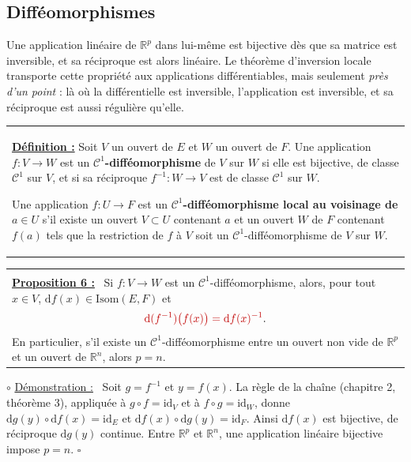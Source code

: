 \documentclass[a4paper,twoside]{report}
\makeatletter
\newcommand{\mot}[1]{\textcolor{rougecours}{\textbf{#1}}}
\newcommand{\rmath}[1]{\textcolor{rougecours}{#1}}
\newenvironment{cadre}%
 {\par\vspace{2mm}\noindent\begin{tabular}{|@{\hspace{4mm}}p{0.93\textwidth}@{\hspace{4mm}}|}
  \hline \\[-2mm]}%
 {\\[2mm] \hline \end{tabular}\par\vspace{3mm}}
\newcommand{\propo}[1]{\textbf{\underline{Proposition #1 :}}~}
\newenvironment{demo}%
 {\par\needspace{4\baselineskip}\vspace{1mm}\noindent$\circ$ \underline{Démonstration :}~\setlength{\parskip}{3pt plus 1pt}}%
 {\hfill$\square$\par\vspace{2mm}}
\newcommand{\R}{\mathbb{R}}
\newcommand{\id}{\mathrm{id}}                     %
\newcommand{\dd}{\mathrm{d}}                      %
\newcommand{\Cc}{\mathcal{C}}                     %
\newcommand{\Isom}{\mathrm{Isom}}                 %
\makeatother
\begin{document}
\subsection{Difféomorphismes}

Une application linéaire de $\R^{p}$ dans lui-même est bijective dès que sa matrice est inversible, et sa réciproque est alors linéaire. Le théorème d'inversion locale transporte cette propriété aux applications différentiables, mais seulement \emph{près d'un point} : là où la différentielle est inversible, l'application est inversible, et sa réciproque est aussi régulière qu'elle.

\begin{center}
\begin{tabularx}{15cm}{||X}
\noindent \textbf{\underline{Définition :}} Soit $V$ un ouvert de $E$ et $W$ un ouvert de $F$. Une application $f : V \to W$ est un \mot{$\Cc^{1}$-difféomorphisme} de $V$ sur $W$ si elle est bijective, de classe $\Cc^{1}$ sur $V$, et si sa réciproque $f^{-1} : W \to V$ est de classe $\Cc^{1}$ sur $W$.

\noindent Une application $f : U \to F$ est un \mot{$\Cc^{1}$-difféomorphisme local au voisinage de $a \in U$} s'il existe un ouvert $V \subset U$ contenant $a$ et un ouvert $W$ de $F$ contenant $f(a)$ tels que la restriction de $f$ à $V$ soit un $\Cc^{1}$-difféomorphisme de $V$ sur $W$.
\end{tabularx}
\end{center}

\begin{cadre}
\propo{6} Si $f : V \to W$ est un $\Cc^{1}$-difféomorphisme, alors, pour tout $x \in V$, $\dd f(x) \in \Isom(E, F)$ et
\[ \rmath{\dd(f^{-1})\big(f(x)\big) = \dd f(x)^{-1}}. \]
En particulier, s'il existe un $\Cc^{1}$-difféomorphisme entre un ouvert non vide de $\R^{p}$ et un ouvert de $\R^{n}$, alors $p = n$.
\end{cadre}

\begin{demo}
Soit $g = f^{-1}$ et $y = f(x)$. La règle de la chaîne (chapitre 2, théorème 3), appliquée à $g \circ f = \id_{V}$ et à $f \circ g = \id_{W}$, donne $\dd g(y) \circ \dd f(x) = \id_{E}$ et $\dd f(x) \circ \dd g(y) = \id_{F}$. Ainsi $\dd f(x)$ est bijective, de réciproque $\dd g(y)$ continue. Entre $\R^{p}$ et $\R^{n}$, une application linéaire bijective impose $p = n$.
\end{demo}
\end{document}
